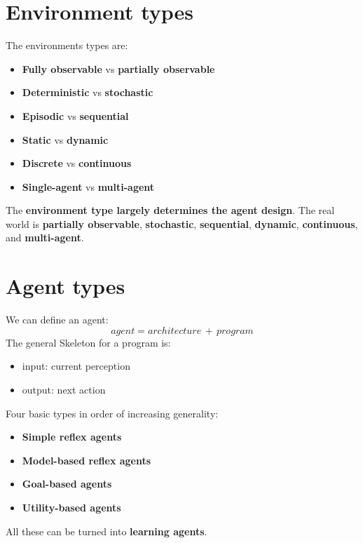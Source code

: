 \section{Environment types}
The environments types are:
\begin{itemize}
    \item \textbf{Fully observable} vs \textbf{partially observable}
    \item \textbf{Deterministic} vs \textbf{stochastic}
    \item \textbf{Episodic} vs \textbf{sequential}
    \item \textbf{Static} vs \textbf{dynamic}
    \item \textbf{Discrete} vs \textbf{continuous}
    \item \textbf{Single-agent} vs \textbf{multi-agent}
\end{itemize}
The \textbf{environment type largely determines the agent design}.
The real world is \textbf{partially observable}, \textbf{stochastic}, \textbf{sequential}, \textbf{dynamic}, \textbf{continuous}, and \textbf{multi-agent}.
\section{Agent types}
We can define an agent:
\[
  agent = architecture \,+\, program  
\]
The general Skeleton for a program is:
\begin{itemize}
    \item input: current perception
    \item output: next action
\end{itemize}
Four basic types in order of increasing generality:
\begin{itemize}
    \item \textbf{Simple reflex agents}
    \item \textbf{Model-based reflex agents}
    \item \textbf{Goal-based agents}
    \item \textbf{Utility-based agents}
\end{itemize}
All these can be turned into \textbf{learning agents}.

